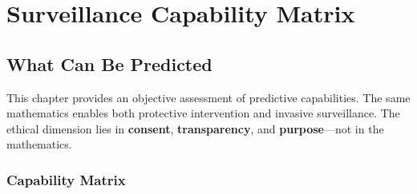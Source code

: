 \documentclass[11pt,twoside]{book}
\begin{document}
\part{Surveillance Capability Matrix}

\chapter{What Can Be Predicted}
\label{ch:capability-matrix}

\begin{tcolorbox}[colback=red!5!white,colframe=red!75!black,title=\textbf{Surveillance Capability Assessment},breakable]
This chapter provides an objective assessment of predictive capabilities. The same mathematics enables both protective intervention and invasive surveillance. The ethical dimension lies in \textbf{consent}, \textbf{transparency}, and \textbf{purpose}---not in the mathematics.
\end{tcolorbox}

\section{Capability Matrix}
\end{document}
